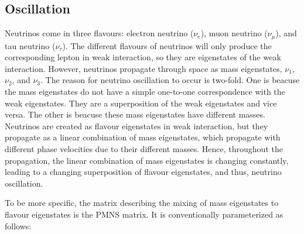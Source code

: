 \subsection{Oscillation}
\label{subsec:oscillation}
Neutrinos come in three flavours: electron neutrino ($\nu_e$), muon neutrino ($\nu_\mu$), and tau neutrino ($\nu_\tau$).
The different flavours of neutrinos will only produce the corresponding lepton in weak interaction, so they are eigenstates of the weak interaction.
However, neutrinos propagate through space as mass eigenstates, $\nu_1$, $\nu_2$, and $\nu_3$.
The reason for neutrino oscillation to occur is two-fold.
One is beacuse the mass eigenstates do not have a simple one-to-one correspondence with the weak eigenstates. 
They are a superposition of the weak eigenstates and vice versa.
The other is beacuse these mass eigenstates have different masses.
Neutrinos are created as flavour eigenstates in weak interaction, but they propagate as a linear combination of mass eigenstates, which propagate with different phase velocities due to their different masses.
Hence, throughout the propagation, the linear combination of mass eigenstates is changing constantly, leading to a changing superposition of flavour eigenstates, and thus, neutrino oscillation.

To be more specific, the matrix describing the mixing of mass eigenstates to flavour eigenstates is the PMNS matrix.
It is conventionally parameterized as follows:

